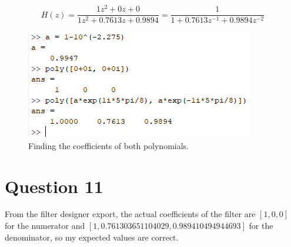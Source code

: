 \documentclass{article}
\begin{document}
\begin{equation}\label{transfer function}
    H(z) = \frac{1z^2 + 0z + 0}{1z^2 + 0.7613z + 0.9894} = \frac{1}{1 + 0.7613z^{-1} + 0.9894z^{-2}}
\end{equation}

\begin{figure}[H]
    \centering
    \includegraphics{Images/polynomials}
    \caption{Finding the coefficients of both polynomials.}
    \label{code:poly}
\end{figure}

\section*{Question 11}
From the filter designer export, the actual coefficients
of the filter are \(\left[ 1, 0, 0 \right]\) for the numerator
and \(\left[1,0.761303651104029,0.989410494944693\right]\) for
the denominator, so my expected values are correct.
\end{document}
